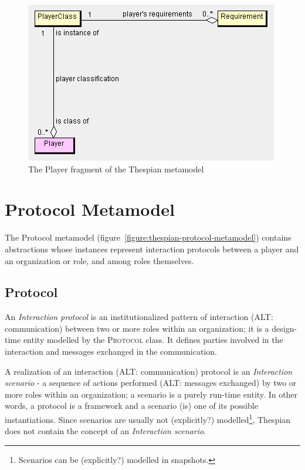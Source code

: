 \begin{figure}[ht]
	\centering
	\includegraphics[width=\textwidth]{images/thespian-player-metamodel.png}
	\caption{The Player fragment of the Thespian metamodel}
	\label{figure:thespian-player-metamodel}
\end{figure}

\section{Protocol Metamodel}

The Protocol metamodel (figure~\ref{figure:thespian-protocol-metamodel}) contains abstractions whose instances represent interaction protocols between a player and an organization or role, and among roles themselves.

\subsection*{Protocol}

An \textit{Interaction protocol} is an institutionalized pattern of interaction (ALT: communication) between two or more roles within an organization; it is a design-time entity modelled by the \textsc{Protocol} class.
It defines parties involved in the interaction and messages exchanged in the communication.

A realization of an interaction (ALT: communication) protocol is an \textit{Interaction scenario} - a sequence of actions performed (ALT: messages exchanged) by two or more roles within an organization; a scenario is a purely run-time entity.
In other words, a protocol is a framework and a scenario (is) one of its possible instantiations.
Since scenarios are usually not (explicitly?) modelled\footnote{Scenarios can be (explicitly?) modelled in snapshots.}, Thespian does not contain the concept of an \textit{Interaction scenario}.

